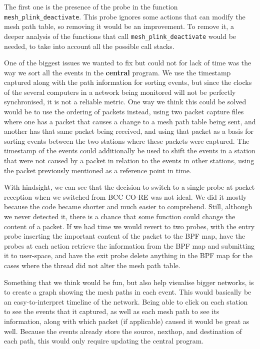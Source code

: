 The first one is the presence of the probe in the function
\texttt{mesh\_plink\_deactivate}. This probe ignores some actions that can
modify the mesh path table, so removing it would be an improvement. To remove
it, a deeper analysis of the functions that call
\texttt{mesh\_plink\_deactivate} would be needed, to take into account all the
possible call stacks.

One of the biggest issues we wanted to fix but could not for lack of time was
the way we sort all the events in the \textbf{central} program. We use the
timestamp captured along with the path information for sorting events, but since
the clocks of the several computers in a network being monitored will not be
perfectly synchronised, it is not a reliable metric. One way we think this could
be solved would be to use the ordering of packets instead, using two packet
capture files where one has a packet that causes a change to a mesh path table
being sent, and another has that same packet being received, and using that
packet as a basis for sorting events between the two stations where these
packets were captured. The timestamp of the events could additionally be used to
shift the events in a station that were not caused by a packet in relation to
the events in other stations, using the packet previously mentioned as a
reference point in time.

With hindsight, we can see that the decision to switch to a single probe at
packet reception when we switched from \ac{BCC} \ac{CO-RE} was not ideal. We did
it mostly because the code became shorter and much easier to comprehend. Still,
although we never detected it, there is a chance that some function could change
the content of a packet. If we had time we would revert to two probes, with the
entry probe inserting the important content of the packet to the BPF map, have
the probes at each action retrieve the information from the BPF map and
submitting it to user-space, and have the exit probe delete anything in the BPF
map for the cases where the thread did not alter the mesh path table.

Something that we think would be fun, but also help visualise bigger networks,
is to create a graph showing the mesh paths in each event. This would basically
be an easy-to-interpret timeline of the network. Being able to click on each
station to see the events that it captured, as well as each mesh path to see its
information, along with which packet (if applicable) caused it would be great as
well. Because the events already store the source, nexthop, and destination of
each path, this would only require updating the central program.

